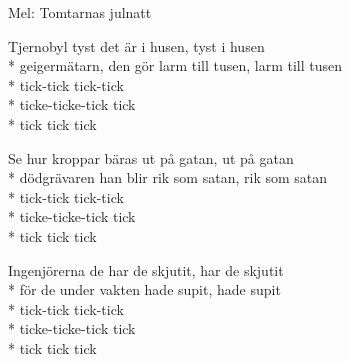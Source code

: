 \begin{SongText}[Geigervisan ]
    \begin{SongInfo}
        Mel: Tomtarnas julnatt
    \end{SongInfo}
    \begin{SongVerse}
        Tjernobyl tyst det är i husen, tyst i husen\\*%
        geigermätarn, den gör larm till tusen, larm till tusen\\*%
        tick-tick tick-tick\\*%
        ticke-ticke-tick tick\\*%
        tick tick tick
    \end{SongVerse}
    \begin{SongVerse}
        Se hur kroppar bäras ut på gatan, ut på gatan\\*%
        dödgrävaren han blir rik som satan, rik som satan\\*%
        tick-tick tick-tick\\*%
        ticke-ticke-tick tick\\*%
        tick tick tick
    \end{SongVerse}
    \begin{SongVerse}
        Ingenjörerna de har de skjutit, har de skjutit\\*%
        för de under vakten hade supit, hade supit\\*%
        tick-tick tick-tick\\*%
        ticke-ticke-tick tick\\*%
        tick tick tick
    \end{SongVerse}
\end{SongText}
